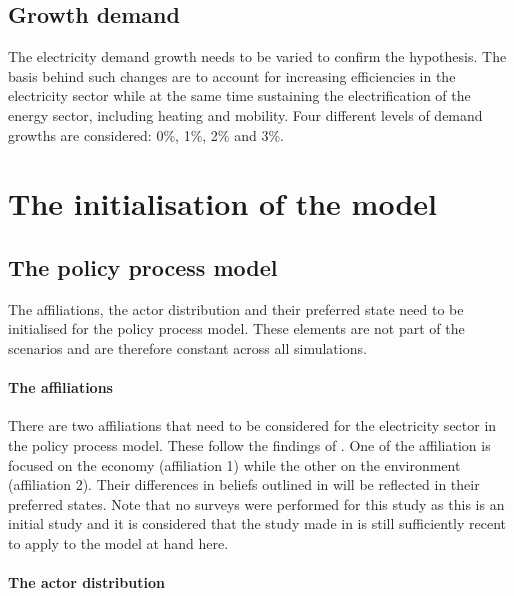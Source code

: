 \subsection{Growth demand}

The electricity demand growth needs to be varied to confirm the hypothesis. The basis behind such changes are to account for increasing efficiencies in the electricity sector while at the same time sustaining the electrification of the energy sector, including heating and mobility. Four different levels of demand growths are considered: 0\%, 1\%, 2\% and 3\%. 



\section{The initialisation of the model}
\label{sec:initialisation}

\subsection{The policy process model}

The affiliations, the actor distribution and their preferred state need to be initialised for the policy process model. These elements are not part of the scenarios and are therefore constant across all simulations.

\paragraph{The affiliations}

There are two affiliations that need to be considered for the electricity sector in the policy process model. These follow the findings of \cite{markard2016socio}. One of the affiliation is focused on the economy (affiliation 1) while the other on the environment (affiliation 2). Their differences in beliefs outlined in \cite{markard2016socio} will be reflected in their preferred states. Note that no surveys were performed for this study as this is an initial study and it is considered that the study made in \cite{markard2016socio} is still sufficiently recent to apply to the model at hand here.


\paragraph{The actor distribution}


